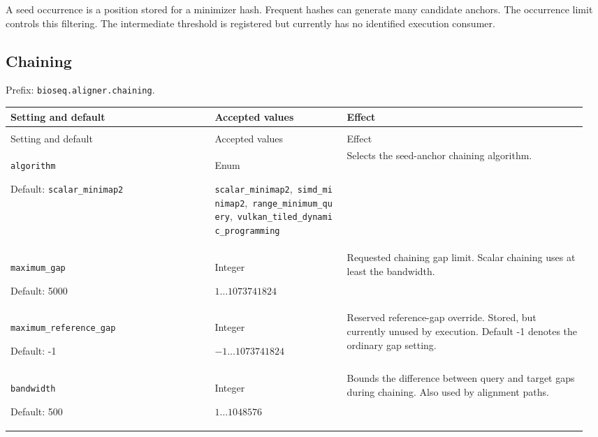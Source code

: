 A seed occurrence is a position stored for a minimizer hash. Frequent hashes
can generate many candidate anchors. The occurrence limit controls this
filtering. The intermediate threshold is registered but currently has no
identified execution consumer.

\subsection{Chaining}

Prefix: \nolinkurl{bioseq.aligner.chaining}.

\begingroup
\small
\setlength{\tabcolsep}{4pt}
\renewcommand{\arraystretch}{1.16}
\begin{longtable}{@{}>{\raggedright\arraybackslash}p{0.34\linewidth}>{\raggedright\arraybackslash}p{0.22\linewidth}>{\raggedright\arraybackslash}p{0.40\linewidth}@{}}
\toprule
Setting and default & Accepted values & Effect \\
\midrule
\endfirsthead
\multicolumn{3}{@{}l}{Prefix: \nolinkurl{bioseq.aligner.chaining} (continued)} \\
\toprule
Setting and default & Accepted values & Effect \\
\midrule
\endhead
\bottomrule
\endfoot
\nolinkurl{algorithm}\par Default: \nolinkurl{scalar_minimap2} & Enum\par \nolinkurl{scalar_minimap2},\allowbreak\ \nolinkurl{simd_minimap2},\allowbreak\ \nolinkurl{range_minimum_query},\allowbreak\ \nolinkurl{vulkan_tiled_dynamic_programming} & Selects the seed-anchor chaining algorithm. \\[4pt]
\nolinkurl{maximum_gap}\par Default: 5000 & Integer\par $1\ldots 1073741824$ & Requested chaining gap limit. Scalar chaining uses at least the bandwidth. \\[4pt]
\nolinkurl{maximum_reference_gap}\par Default: -1 & Integer\par $-1\ldots 1073741824$ & Reserved reference-gap override. Stored, but currently unused by execution. Default -1 denotes the ordinary gap setting. \\[4pt]
\nolinkurl{bandwidth}\par Default: 500 & Integer\par $1\ldots 1048576$ & Bounds the difference between query and target gaps during chaining. Also used by alignment paths. \\[4pt]

\end{longtable}
